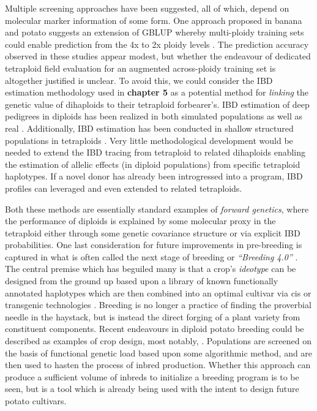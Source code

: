 \documentclass[
]{article}
\begin{document}
Multiple screening approaches have been suggested, all of which, depend
on molecular marker information of some form. One approach proposed in
banana and potato suggests an extension of GBLUP whereby multi-ploidy
training sets could enable prediction from the 4x to 2x ploidy levels
\autocite{Nyine2018,Wilson2021}. The prediction accuracy observed in
these studies appear modest, but whether the endeavour of dedicated
tetraploid field evaluation for an augmented across-ploidy training set
is altogether justified is unclear. To avoid this, we could consider the
IBD estimation methodology used in \textbf{chapter 5} as a potential
method for \emph{linking} the genetic value of dihaploids to their
tetraploid forbearer's. IBD estimation of deep pedigrees in diploids has
been realized in both simulated populations as well as real
\autocite{Li2021}. Additionally, IBD estimation has been conducted in
shallow structured populations in tetraploids
\autocite{Amadeu2021,Song2023}. Very little methodological development
would be needed to extend the IBD tracing from tetraploid to related
dihaploids enabling the estimation of allelic effects (in diploid
populations) from specific tetraploid haplotypes. If a novel donor has
already been introgressed into a program, IBD profiles can leveraged and
even extended to related tetraploids.

Both these methods are essentially standard examples of \emph{forward
genetics}, where the performance of diploids is explained by some
molecular proxy in the tetraploid either through some genetic covariance
structure or via explicit IBD probabilities. One last consideration for
future improvements in pre-breeding is captured in what is often called
the next stage of breeding or \emph{``Breeding 4.0''}
\autocite{Wallace2018}. The central premise which has beguiled many is
that a crop's \emph{ideotype} can be designed from the ground up based
upon a library of known functionally annotated haplotypes which are then
combined into an optimal cultivar via cis or transgenic technologies
\autocite{Varshney2021}. Breeding is no longer a practice of finding the
proverbial needle in the haystack, but is instead the direct forging of
a plant variety from constituent components. Recent endeavours in
diploid potato breeding could be described as examples of crop design,
most notably, \textcite{Zhang2021}. Populations are screened on the
basis of functional genetic load based upon some algorithmic method, and
are then used to hasten the process of inbred production. Whether this
approach can produce a sufficient volume of inbreds to initialize a
breeding program is to be seen, but is a tool which is already being
used with the intent to design future potato cultivars.
\end{document}
